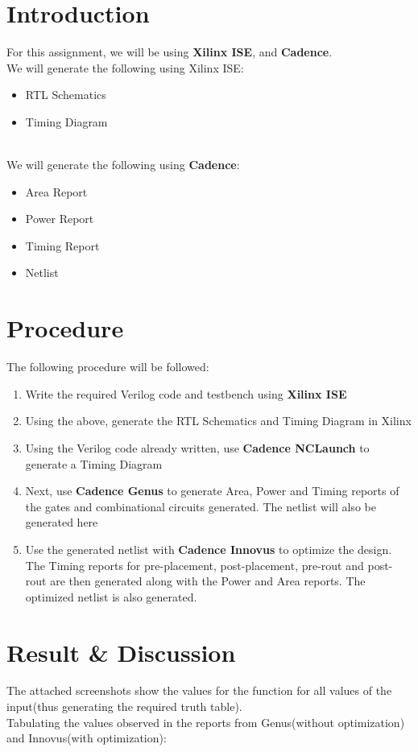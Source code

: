 \documentclass[a4paper,11pt]{report}
\begin{document}
\section{Introduction}
For this assignment, we will be using \textbf{Xilinx ISE}, and \textbf{Cadence}.
\\ We will generate the following using Xilinx ISE:
\begin{itemize}
\item RTL Schematics
\item Timing Diagram
\end{itemize}
\\ We will generate the following using \textbf{Cadence}:
\begin{itemize}
\item Area Report
\item Power Report
\item Timing Report
\item Netlist
\end{itemize}

\section{Procedure}
The following procedure will be followed:
\begin{enumerate}
\item Write the required Verilog code and testbench using \textbf{Xilinx ISE}
\item Using the above, generate the RTL Schematics and Timing Diagram in Xilinx
\item Using the Verilog code already written, use \textbf{Cadence NCLaunch} to generate a Timing Diagram
\item Next, use \textbf{Cadence Genus} to generate Area, Power and Timing reports of the gates and combinational circuits generated. The netlist will also be generated here
\item Use the generated netlist with \textbf{Cadence Innovus} to optimize the design. The Timing reports for pre-placement, post-placement, pre-rout and post-rout are then generated along with the Power and Area reports. The optimized netlist is also generated.
\end{enumerate}

\section{Result \& Discussion}

The attached screenshots show the values for the function for all values of the input(thus generating the required truth table). \\
Tabulating the values observed in the reports from Genus(without optimization) and Innovus(with optimization): \\
\end{document}
